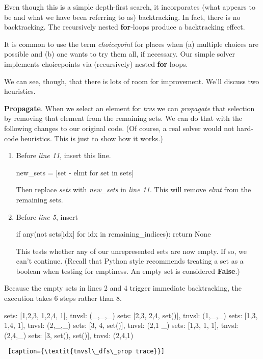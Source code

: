 Even though this is a simple depth-first search, it incorporates (what appears to be and what we have been referring to as) backtracking. In fact, there is no backtracking. The recursively nested \textbf{for}-loops produce a backtracking effect.  

It is common to use the term \textit{choicepoint} for places when (a) multiple choices are possible and (b) one wants to try them all, if necessary. Our simple solver implements choicepoints via (recursively) nested \textbf{for}-loops. 

We can see, though, that there is lots of room for improvement. We'll discuss two heuristics. 

\noindent\textbf{Propagate}. When we select an element for \textit{trvs} we can \textit{propagate} that selection by removing that element from the remaining sets. We can do that with the following changes to our original code. (Of course, a real solver would not hard-code heuristics. This is just to show how it works.)
\begin{enumerate}
    \item Before \textit{line 11}, insert this line.
    
\begin{minipage}[c]{0.45\textwidth}
\begin{python1}
new_sets = [set - {elmt} for set in sets]
\end{python1}
\end{minipage}

Then replace \textit{sets} with \textit{new\_sets} in \textit{line 11}.
This will remove \textit{elmt} from the remaining sets.

    \item Before \textit{line 5}, insert
    
\begin{python1}
if any(not sets[idx] for idx in remaining_indices):
  return None
\end{python1}

This tests whether any of our unrepresented sets are now empty. If so, we can't continue. (Recall that Python style recommends treating a set as a boolean when testing for emptiness. An empty set is considered \textbf{False}.)


\end{enumerate}

Because the empty sets in lines 2 and 4  trigger immediate backtracking, the execution takes 6 steps rather than 8.

\smallv
\begin{minipage}[c]{0.45\textwidth}
\begin{python1}  
sets: [{1,2,3}, {1,2,4}, {1}], tnvsl: (_,_,_)
  sets: [{2,3}, {2,4}, set()], tnvsl: (1,_,_)
  sets: [{1,3}, {1,4}, {1}], tnvsl: (2,_,_)
    sets: [{3}, {4}, set()], tnvsl: (2,1 _)
    sets: [{1,3}, {1}, {1}], tnvsl: (2,4,_)
      sets: [{3}, set(), set()], tnvsl: (2,4,1)
\end{python1}\linv
\begin{lstlisting} [caption={\textit{tnvsl\_dfs\_prop trace}}]
\end{lstlisting}
\end{minipage}

